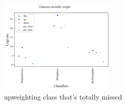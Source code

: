\begin{figure}
	\begin{center}
		\includegraphics[width=0.5\textwidth]{./fig/systematic_Unknown_invisible.png}
		\caption{upweighting class that's totally missed}
		\label{fig:systematic_invisible}
	\end{center}
\end{figure}
